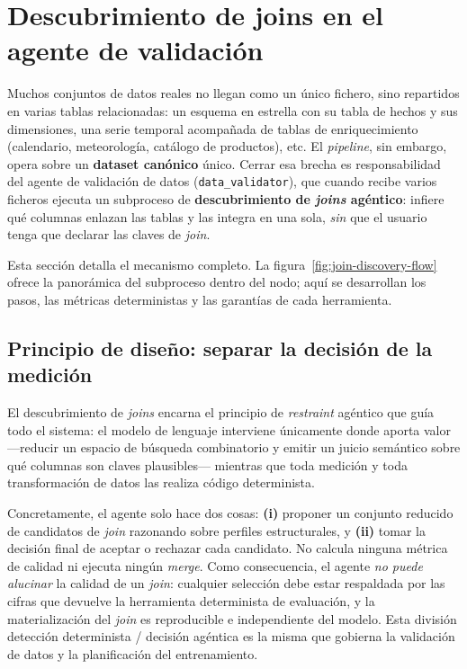 \section{Descubrimiento de joins en el agente de validación}
\label{sec:join-discovery}

Muchos conjuntos de datos reales no llegan como un único fichero, sino repartidos en
varias tablas relacionadas: un esquema en estrella con su tabla de hechos y sus
dimensiones, una serie temporal acompañada de tablas de enriquecimiento (calendario,
meteorología, catálogo de productos), etc. El \textit{pipeline}, sin embargo, opera
sobre un \textbf{dataset canónico} único. Cerrar esa brecha es responsabilidad del
agente de validación de datos (\texttt{data\_validator}), que cuando recibe varios
ficheros ejecuta un subproceso de \textbf{descubrimiento de \textit{joins} agéntico}:
infiere qué columnas enlazan las tablas y las integra en una sola, \emph{sin} que el
usuario tenga que declarar las claves de \textit{join}.

Esta sección detalla el mecanismo completo. La figura~\ref{fig:join-discovery-flow}
ofrece la panorámica del subproceso dentro del nodo; aquí se desarrollan los pasos, las
métricas deterministas y las garantías de cada herramienta.

\subsection{Principio de diseño: separar la decisión de la medición}
\label{sec:join-principio}

El descubrimiento de \textit{joins} encarna el principio de \textit{restraint} agéntico
que guía todo el sistema: el modelo de lenguaje interviene únicamente donde aporta
valor —reducir un espacio de búsqueda combinatorio y emitir un juicio semántico sobre
qué columnas son claves plausibles— mientras que toda medición y toda transformación de
datos las realiza código determinista.

Concretamente, el agente solo hace dos cosas: \textbf{(i)} proponer un conjunto reducido
de candidatos de \textit{join} razonando sobre perfiles estructurales, y \textbf{(ii)}
tomar la decisión final de aceptar o rechazar cada candidato. No calcula ninguna métrica
de calidad ni ejecuta ningún \textit{merge}. Como consecuencia, el agente \emph{no puede
alucinar} la calidad de un \textit{join}: cualquier selección debe estar respaldada por
las cifras que devuelve la herramienta determinista de evaluación, y la materialización
del \textit{join} es reproducible e independiente del modelo. Esta división detección
determinista / decisión agéntica es la misma que gobierna la validación de datos y la
planificación del entrenamiento.

